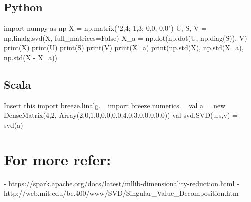 \subsection{Python}
import numpy as np
X = np.matrix("2,4; 1,3; 0,0; 0,0")
U, S, V = np.linalg.svd(X, full_matrices=False)
X_a = np.dot(np.dot(U, np.diag(S)), V)
print(X)
print(U)
print(S)
print(V)
print(X_a)
print(np.std(X), np.std(X_a), np.std(X - X_a))

\subsection{Scala}
Insert this
import breeze.linalg._
import breeze.numerics._
val a = new DenseMatrix(4,2, Array(2.0,1.0,0.0,0.0,4.0,3.0,0.0,0.0))
val svd.SVD(u,s,v) = svd(a)

\section{For more refer:}
- https://spark.apache.org/docs/latest/mllib-dimensionality-reduction.html
- http://web.mit.edu/be.400/www/SVD/Singular_Value_Decomposition.htm

